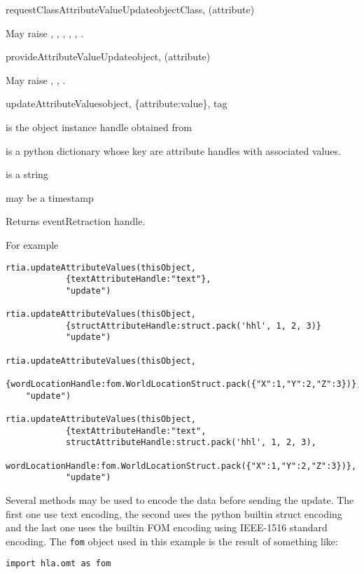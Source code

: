 \begin{methoddesc}{requestClassAttributeValueUpdate}{objectClass, (attribute)}

May raise
,
,
,
,
,
.
\end{methoddesc}

\begin{methoddesc}{provideAttributeValueUpdate}{object, (attribute)}

May raise
,
,
.
\end{methoddesc}

\begin{methoddesc}[rtia]{updateAttributeValues}{object, \{attribute:value\},
tag}
\begin{description}
\item {} is the object instance handle obtained from
\item {} is a python dictionary whose key are attribute
handles with associated values.
\item {} is a string
\item {} may be a timestamp
\end{description}
Returns eventRetraction handle.

For example
\begin{verbatim}
rtia.updateAttributeValues(thisObject,
            {textAttributeHandle:"text"},
            "update")
    
rtia.updateAttributeValues(thisObject,
            {structAttributeHandle:struct.pack('hhl', 1, 2, 3)}
            "update")
            
rtia.updateAttributeValues(thisObject,
    {wordLocationHandle:fom.WorldLocationStruct.pack({"X":1,"Y":2,"Z":3})},
    "update")            
            
rtia.updateAttributeValues(thisObject,
            {textAttributeHandle:"text",
            structAttributeHandle:struct.pack('hhl', 1, 2, 3),           
            wordLocationHandle:fom.WorldLocationStruct.pack({"X":1,"Y":2,"Z":3})},
            "update")            
\end{verbatim}

Several methods may be used to encode the data before sending the update.
The first one use text encoding, the second uses the python builtin
struct encoding  
and the last one uses the builtin  FOM encoding using
IEEE-1516 standard encoding. The \texttt{fom} object used in this
example is the result of something like:
\begin{verbatim}
import hla.omt as fom


\end{verbatim}
\end{methoddesc}
